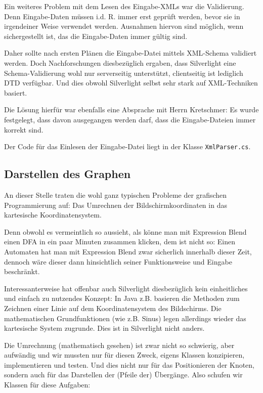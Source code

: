 Ein weiteres Problem mit dem Lesen des Eingabe-XMLs war die Validierung. Denn
Eingabe-Daten müssen i.d. R. immer erst geprüft werden, bevor sie in
irgendeiner Weise verwendet werden. Ausnahmen hiervon sind möglich, wenn
sichergestellt ist, das die Eingabe-Daten immer gültig sind.

Daher sollte nach ersten Plänen die Eingabe-Datei mittels XML-Schema validiert
werden. Doch Nachforschungen diesbezüglich ergaben, dass Silverlight eine
Schema-Validierung wohl nur serverseitig unterstützt, clientseitig ist
lediglich DTD verfügbar. Und dies obwohl Silverlight selbst sehr stark auf
XML-Techniken basiert.

Die Lösung hierfür war ebenfalls eine Absprache mit Herrn Kretschmer: Es wurde
festgelegt, dass davon ausgegangen werden darf, dass die Eingabe-Dateien immer
korrekt sind.

Der Code für das Einlesen der Eingabe-Datei liegt in der Klasse \texttt{XmlParser.cs}.

\subsection{Darstellen des Graphen}
An dieser Stelle traten die wohl ganz typischen Probleme der grafischen
Programmierung auf: Das Umrechnen der Bildschirmkoordinaten in das kartesische
Koordinatensystem.

Denn obwohl es vermeintlich so aussieht, als könne man mit Expression Blend
einen DFA in ein paar Minuten zusammen klicken, dem ist nicht so: Einen
Automaten hat man mit Expression Blend zwar sicherlich innerhalb dieser Zeit,
dennoch wäre dieser dann hinsichtlich seiner Funktionsweise und Eingabe
beschränkt.

Interessanterweise hat offenbar auch Silverlight diesbezüglich kein
einheitliches und einfach zu nutzendes Konzept: In Java z.B. basieren die
Methoden zum Zeichnen einer Linie auf dem Koordinatensystem des Bildschirms.
Die mathematischen Grundfunktionen (wie z.B. Sinus) legen allerdings wieder das
kartesische System zugrunde. Dies ist in Silverlight nicht anders.

Die Umrechnung (mathematisch gesehen) ist zwar nicht so schwierig, aber
aufwändig und wir mussten nur für diesen Zweck, eigens Klassen konzipieren,
implementieren und testen. Und dies nicht nur für das Positionieren der Knoten,
sondern auch für das Darstellen der (Pfeile der) Übergänge. Also schufen wir
Klassen für diese Aufgaben:

